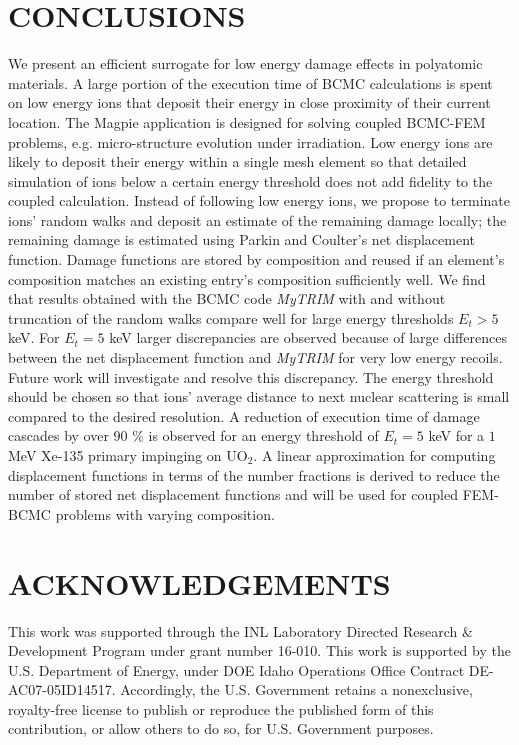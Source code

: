 \documentclass[letterpaper]{mandc2019}
\begin{document}
\section{CONCLUSIONS} \label{sec:conclusion}
We present an efficient surrogate for low energy damage effects in polyatomic materials. A large portion of the execution time of BCMC calculations is spent on low energy ions that deposit their energy in close proximity of their current location. The Magpie application is designed for solving coupled BCMC-FEM problems, e.g. micro-structure evolution under irradiation. Low energy ions are likely to deposit their energy within a single mesh element so that detailed simulation of ions below a certain energy threshold does not add fidelity to the coupled calculation. Instead of following low energy ions, we propose to terminate ions' random walks and deposit an estimate of the remaining damage locally; the remaining damage is estimated using Parkin and Coulter's net displacement function. Damage functions are stored by composition and reused if an element's composition matches an existing entry's composition sufficiently well. 
We find that results obtained with the BCMC code \textit{MyTRIM} 
  with and without truncation of the random walks compare well for large energy thresholds $E_t > 5$ keV. For $E_t = 5$ keV larger discrepancies are observed because of large differences between the net displacement function and \textit{MyTRIM} for very low energy recoils. Future work will investigate and resolve this discrepancy. The energy threshold should be chosen so that ions' average distance to next nuclear scattering is small compared to the desired resolution. A reduction of execution time of damage cascades by over $90$ \% is observed for an energy threshold of $E_t = 5$ keV for a $1$ MeV Xe-135 primary impinging on UO$_2$.
A linear approximation for computing displacement functions in terms of the number fractions is derived to reduce the number of stored net displacement functions and will be used for coupled FEM-BCMC problems with varying composition.   
 
 \clearpage
\section*{ACKNOWLEDGEMENTS}
This work was supported through the INL Laboratory Directed
Research & Development Program under grant number 16-010.
This work is supported by the U.S. Department of Energy, under DOE
Idaho Operations Office Contract DE-AC07-05ID14517.  Accordingly, the
U.S. Government retains a nonexclusive, royalty-free license to
publish or reproduce the published form of this contribution, or allow
others to do so, for U.S. Government purposes.

\setlength{\baselineskip}{12pt}


\end{document}
